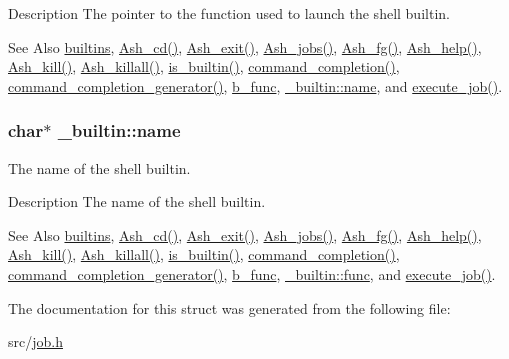 \begin{DoxyParagraph}{Description}
The pointer to the function used to launch the shell builtin.
\end{DoxyParagraph}
\begin{DoxySeeAlso}{See Also}
\hyperlink{job_8c_a2c5551422426f406568d84844b40acb9}{builtins}, \hyperlink{job_8c_a2c2cfa6591ee05cc5bf0c39f38b9e2ea}{Ash\-\_\-cd()}, \hyperlink{job_8c_a9fa5abe15df71a688905dc7b29a1389f}{Ash\-\_\-exit()}, \hyperlink{job_8c_a8950ee4bf84f8322e0b294d0c448a9e7}{Ash\-\_\-jobs()}, \hyperlink{job_8c_a792fcc9814d020b087911591c5fce10b}{Ash\-\_\-fg()}, \hyperlink{job_8c_a4242d3cdbc0468d774243dc67b330296}{Ash\-\_\-help()}, \hyperlink{job_8c_a723e6648fca47a139cdff5cf4f1bc4bb}{Ash\-\_\-kill()}, \hyperlink{job_8c_a07e5c62e1d5e55012cf188dd32b6cf27}{Ash\-\_\-killall()}, \hyperlink{job_8c_a028aee0dd87474ee61f6c654efe653a2}{is\-\_\-builtin()}, \hyperlink{cle_8c_ab57f2ac63325fc919968e7eb78586965}{command\-\_\-completion()}, \hyperlink{cle_8c_ade079408c61657dc7bbd2142a78e0e8a}{command\-\_\-completion\-\_\-generator()}, \hyperlink{job_8h_af6b8d1779250c4d2f3c902dc1aad5a5d}{b\-\_\-func}, \hyperlink{struct__builtin_adfb6bdcbe370c381dcb71f91fcc65319}{\-\_\-builtin\-::name}, and \hyperlink{job_8c_a328634c49391a29ef1d4e86d6bf0ea7e}{execute\-\_\-job()}. 
\end{DoxySeeAlso}
\hypertarget{struct__builtin_adfb6bdcbe370c381dcb71f91fcc65319}{
\subsubsection[{name}]{\setlength{\rightskip}{0pt plus 5cm}char$\ast$ \-\_\-builtin\-::name}}\label{struct__builtin_adfb6bdcbe370c381dcb71f91fcc65319}


The name of the shell builtin. 

\begin{DoxyParagraph}{Description}
The name of the shell builtin.
\end{DoxyParagraph}
\begin{DoxySeeAlso}{See Also}
\hyperlink{job_8c_a2c5551422426f406568d84844b40acb9}{builtins}, \hyperlink{job_8c_a2c2cfa6591ee05cc5bf0c39f38b9e2ea}{Ash\-\_\-cd()}, \hyperlink{job_8c_a9fa5abe15df71a688905dc7b29a1389f}{Ash\-\_\-exit()}, \hyperlink{job_8c_a8950ee4bf84f8322e0b294d0c448a9e7}{Ash\-\_\-jobs()}, \hyperlink{job_8c_a792fcc9814d020b087911591c5fce10b}{Ash\-\_\-fg()}, \hyperlink{job_8c_a4242d3cdbc0468d774243dc67b330296}{Ash\-\_\-help()}, \hyperlink{job_8c_a723e6648fca47a139cdff5cf4f1bc4bb}{Ash\-\_\-kill()}, \hyperlink{job_8c_a07e5c62e1d5e55012cf188dd32b6cf27}{Ash\-\_\-killall()}, \hyperlink{job_8c_a028aee0dd87474ee61f6c654efe653a2}{is\-\_\-builtin()}, \hyperlink{cle_8c_ab57f2ac63325fc919968e7eb78586965}{command\-\_\-completion()}, \hyperlink{cle_8c_ade079408c61657dc7bbd2142a78e0e8a}{command\-\_\-completion\-\_\-generator()}, \hyperlink{job_8h_af6b8d1779250c4d2f3c902dc1aad5a5d}{b\-\_\-func}, \hyperlink{struct__builtin_adb30d358f5fb6b16dc124796851e0c48}{\-\_\-builtin\-::func}, and \hyperlink{job_8c_a328634c49391a29ef1d4e86d6bf0ea7e}{execute\-\_\-job()}. 
\end{DoxySeeAlso}


The documentation for this struct was generated from the following file\-:\begin{DoxyCompactItemize}
\item 
src/\hyperlink{job_8h}{job.\-h}\end{DoxyCompactItemize}
